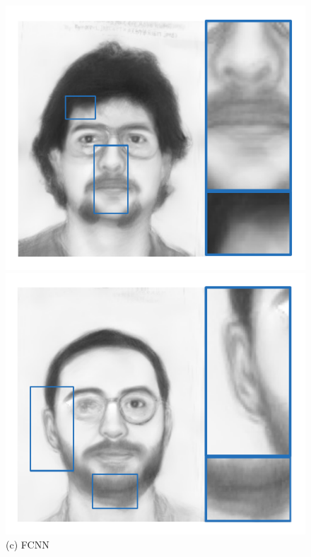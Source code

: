 \documentclass[10pt,twocolumn,letterpaper]{article}
\begin{document}
\begin{figure}[htbp]
\begin{minipage}[t]{0.138\linewidth}
\includegraphics[width=0.99\linewidth]{img/example3_Filter.pdf}
\includegraphics[width=0.99\linewidth]{img/example4_Filter.pdf}
(c) FCNN
\end{minipage}
\begin{minipage}[t]{0.138\linewidth}
\centering

\end{minipage}
\end{figure}
\end{document}
